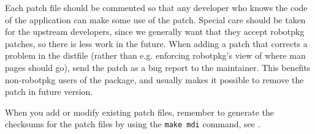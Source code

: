 Each patch file should be commented so that any developer who knows the code of
the application  can make some use of  the patch. Special care  should be taken
for the upstream developers, since  we generally want that they accept robotpkg
patches, so there is less work in the future. When adding a patch that corrects
a problem in the distfile (rather than e.g. enforcing robotpkg's view of where
man pages should go), send the patch as a bug report to the maintainer. This
benefits non-robotpkg users of the package, and usually makes it possible to
remove the patch in future version.

When you add or modify existing patch files, remember to generate the checksums
for the patch files by using the {\tt make mdi} command, see
.
